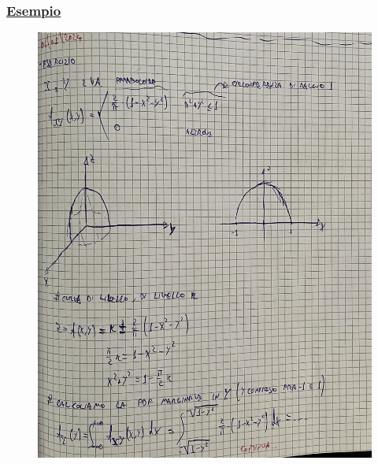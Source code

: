 \documentclass{article}
\begin{document}
\subsubsection{\underline{Esempio}}
\begin{figure}[ht]
\centering
\includegraphics[scale=0.14]{ese/44.jpeg}
\end{figure} 
\end{document}
